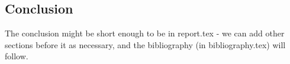 \documentclass[12pt, letterpaper, twoside]{article}
\begin{document}
\begin{spacing}{1.0}
\begin{multicols}{2}
\section{Conclusion}
The conclusion might be short enough to be in report.tex - we can add other sections before it as necessary, and the bibliography (in bibliography.tex) will follow.




\end{multicols}

\end{spacing}
\end{document}
